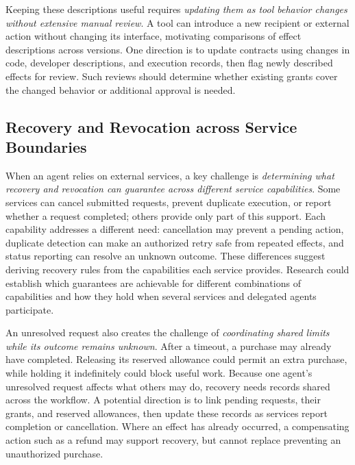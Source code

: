 Keeping these descriptions useful requires \emph{updating them as tool behavior changes without extensive manual review}. A tool can introduce a new recipient or external action without changing its interface, motivating comparisons of effect descriptions across versions. One direction is to update contracts using changes in code, developer descriptions, and execution records, then flag newly described effects for review. Such reviews should determine whether existing grants cover the changed behavior or additional approval is needed.

\subsection{Recovery and Revocation across Service Boundaries}
When an agent relies on external services, a key challenge is \emph{determining what recovery and revocation can guarantee across different service capabilities}. Some services can cancel submitted requests, prevent duplicate execution, or report whether a request completed; others provide only part of this support. Each capability addresses a different need: cancellation may prevent a pending action, duplicate detection can make an authorized retry safe from repeated effects, and status reporting can resolve an unknown outcome. These differences suggest deriving recovery rules from the capabilities each service provides. Research could establish which guarantees are achievable for different combinations of capabilities and how they hold when several services and delegated agents participate.

An unresolved request also creates the challenge of \emph{coordinating shared limits while its outcome remains unknown}. After a timeout, a purchase may already have completed. Releasing its reserved allowance could permit an extra purchase, while holding it indefinitely could block useful work. Because one agent's unresolved request affects what others may do, recovery needs records shared across the workflow. A potential direction is to link pending requests, their grants, and reserved allowances, then update these records as services report completion or cancellation. Where an effect has already occurred, a compensating action such as a refund may support recovery, but cannot replace preventing an unauthorized purchase.


